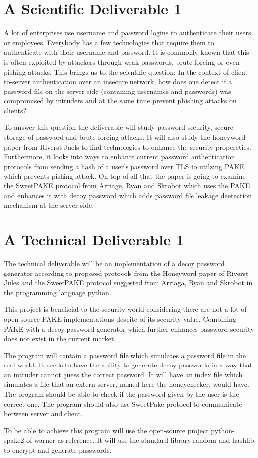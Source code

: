 \documentclass[conference,compsoc]{IEEEtran}
\begin{document}
\section{ A Scientific Deliverable 1 } 
A lot of enterprises use username and password logins to authenticate their
users or employees. Everybody has a few technologies that require them to
authenticate with their username and password. It is commonly known that this is
often exploited by attackers through weak passwords, brute forcing or even
pishing attacks. This brings us to the scientific question: In the context of
client-to-server authentication over an insecure network, how does one detect if a
password file on the server side (containing usernames and passwords) was
compromised by intruders and at the same time prevent phishing attacks on
clients?

To answer this question the deliverable will study password security, secure
storage of password and brute forcing attacks. It will also study the honeyword
paper from Riverst Juels \cite{juels2013honeywords} to find technologies to
enhance the security propereties. Furthermore, it looks into ways to enhance
current password authentication protocols from sending a hash of a user's
password over TLS to utilzing PAKE which prevents pishing attack. On top of all
that the paper is going to examine the SweetPAKE protocol from Arriage, Ryan
and Skrobot \cite{sweetpake} which uses the PAKE and enhances it with decoy
password which adds password file leakage deetection mechanism at the server
side.

\section{A Technical Deliverable 1 }

The technical deliverable will be an implementation of a decoy password
generator according to proposed protocols from the Honeyword paper
\cite{juels2013honeywords} of Riverst Jules and the SweetPAKE protocol
\cite{sweetpake} suggested from Arriaga, Ryan and Skrobot in the programming
language python.

This project is beneficial to the security world considering there are not a
lot of open-source PAKE implementations despite of its security value.
Combining PAKE with a decoy password generator which further enhances password
security does not exist in the current market.

The program will contain a password file which simulates a password file in the
real world. It needs to have the ability to generate decoy passwords in a way
that an intruder cannot guess the correct password. It will have an index file
which simulates a file that an extern server, named here the honeychecker,
would have. The program should be able to check if the password given by the
user is the correct one. The program should also use SweetPake protocol to
communicate between server and client.

To be able to achieve this program will use the open-source project
python-spake2 of warner as reference. It will use the standard library 
random and hashlib to encrypt and generate passwords.

\printbibliography

\clearpage
\end{document}
